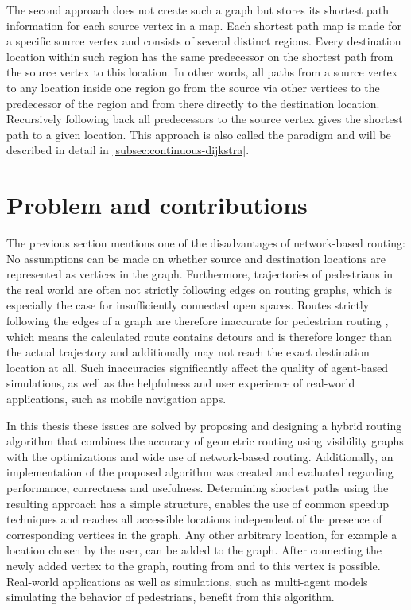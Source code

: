 	The second approach does not create such a graph but stores its shortest path information for each source vertex in a map.
	Each shortest path map is made for a specific source vertex and consists of several distinct regions.
	Every destination location within such region has the same predecessor on the shortest path from the source vertex to this location.
	In other words, all paths from a source vertex to any location inside one region go from the source via other vertices to the predecessor of the region and from there directly to the destination location.
	Recursively following back all predecessors to the source vertex gives the shortest path to a given location.
	This approach is also called the  paradigm and will be described in detail in \cref{subsec:continuous-dijkstra}.
	
\section{Problem and contributions}

	The previous section mentions one of the disadvantages of network-based routing:
	No assumptions can be made on whether source and destination locations are represented as vertices in the graph.
	Furthermore, trajectories of pedestrians in the real world are often not strictly following edges on routing graphs, which is especially the case for insufficiently connected open spaces.
	Routes strictly following the edges of a graph are therefore inaccurate for pedestrian routing \cite{graser-osm-open-spaces}, which means the calculated route contains detours and is therefore longer than the actual trajectory and additionally may not reach the exact destination location at all.
	Such inaccuracies significantly affect the quality of agent-based simulations, as well as the helpfulness and user experience of real-world applications, such as mobile navigation apps.

	In this thesis these issues are solved by proposing and designing a hybrid routing algorithm that combines the accuracy of geometric routing using visibility graphs with the optimizations and wide use of network-based routing.
	Additionally, an implementation of the proposed algorithm was created and evaluated regarding performance, correctness and usefulness.
	Determining shortest paths using the resulting approach has a simple structure, enables the use of common speedup techniques and reaches all accessible locations independent of the presence of corresponding vertices in the graph.
	Any other arbitrary location, for example a location chosen by the user, can be added to the graph.
	After connecting the newly added vertex to the graph, routing from and to this vertex is possible.
	Real-world applications as well as simulations, such as multi-agent models simulating the behavior of pedestrians, benefit from this algorithm.
	
